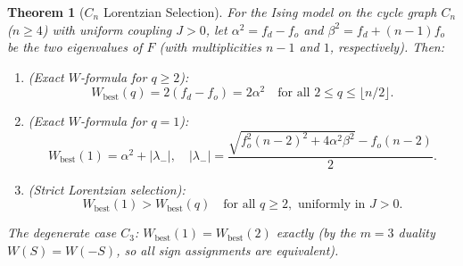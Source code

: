 \documentclass[11pt]{article}
\newtheorem{theorem}{Theorem}[section]
\theoremstyle{definition}
\theoremstyle{remark}
\newcommand{\Fish}{F}
\begin{document}
\begin{theorem}[$C_n$ Lorentzian Selection]
\label{thm:cn-lorentzian}
For the Ising model on the cycle graph $C_n$ ($n \geq 4$) with uniform
coupling $J > 0$, let $\alpha^2 = f_d - f_o$ and $\beta^2 = f_d + (n-1)f_o$
be the two eigenvalues of $\Fish$ (with multiplicities $n-1$ and $1$,
respectively). Then:
\begin{enumerate}
\item[(i)] \emph{(Exact $W$-formula for $q \geq 2$):}
  \begin{equation}
    W_{\mathrm{best}}(q) = 2(f_d - f_o) = 2\alpha^2
    \quad \text{for all } 2 \leq q \leq \lfloor n/2 \rfloor.
    \label{eq:Wbest-q2-cn}
  \end{equation}
\item[(ii)] \emph{(Exact $W$-formula for $q = 1$):}
  \begin{equation}
    W_{\mathrm{best}}(1) = \alpha^2 + |\lambda_-|, \quad
    |\lambda_-| = \frac{\sqrt{f_o^2(n-2)^2 + 4\alpha^2\beta^2} - f_o(n-2)}{2}.
    \label{eq:Wbest-q1-cn}
  \end{equation}
\item[(iii)] \emph{(Strict Lorentzian selection):}
  \begin{equation}
    W_{\mathrm{best}}(1) > W_{\mathrm{best}}(q) \quad \text{for all } q \geq 2,
    \text{ uniformly in } J > 0.
    \label{eq:Wbest-strict-cn}
  \end{equation}
\end{enumerate}
The degenerate case $C_3$: $W_{\mathrm{best}}(1) = W_{\mathrm{best}}(2)$ exactly
(by the $m = 3$ duality $W(S) = W(-S)$, so all sign assignments are equivalent).
\end{theorem}
\end{document}
